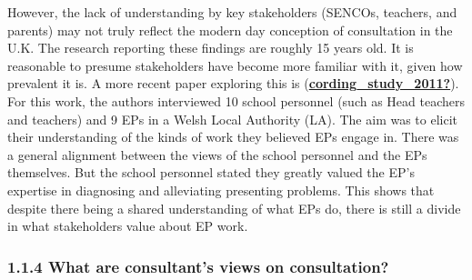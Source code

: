 \documentclass[
]{article}
\begin{document}
However, the lack of understanding by key stakeholders (SENCOs,
teachers, and parents) may not truly reflect the modern day conception
of consultation in the U.K. The research reporting these findings are
roughly 15 years old. It is reasonable to presume stakeholders have
become more familiar with it, given how prevalent it is. A more recent
paper exploring this is
(\protect\hyperlink{ref-cording_study_2011}{\textbf{cording\_study\_2011?}}).
For this work, the authors interviewed 10 school personnel (such as Head
teachers and teachers) and 9 EPs in a Welsh Local Authority (LA). The
aim was to elicit their understanding of the kinds of work they believed
EPs engage in. There was a general alignment between the views of the
school personnel and the EPs themselves. But the school personnel stated
they greatly valued the EP's expertise in diagnosing and alleviating
presenting problems. This shows that despite there being a shared
understanding of what EPs do, there is still a divide in what
stakeholders value about EP work.

\hypertarget{what-are-consultants-views-on-consultation}{%
\subsubsection{1.1.4 What are consultant's views on
consultation?}\label{what-are-consultants-views-on-consultation}}
\end{document}
